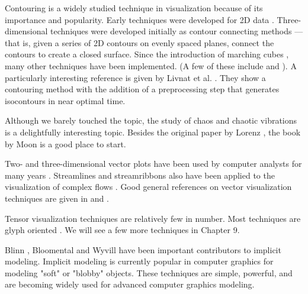 Contouring is a widely studied technique in visualization because of its importance and popularity. Early techniques were developed for 2D data \cite{Watson92}. Three-dimensional techniques were developed initially as contour connecting methods \cite{Fuchs77} --- that is, given a series of 2D contours on evenly spaced planes, connect the contours to create a closed surface. Since the introduction of marching cubes \cite{Lorensen87}, many other techniques have been implemented. (A few of these include \cite{Nielson91} \cite{Montani94} and \cite{Durst88} ). A particularly interesting reference is given by Livnat et al. \cite{Livnat96}. They show a contouring method with the addition of a preprocessing step that generates isocontours in near optimal time.

Although we barely touched the topic, the study of chaos and chaotic vibrations is a delightfully interesting topic. Besides the original paper by Lorenz \cite{Lorenz63}, the book by Moon \cite{Moon87} is a good place to start.

Two- and three-dimensional vector plots have been used by computer analysts for many years \cite{Fuller80}. Streamlines and streamribbons also have been applied to the visualization of complex flows \cite{Volpe89}. Good general references on vector visualization techniques are given in \cite{Helman90} and \cite{Richter90}.

Tensor visualization techniques are relatively few in number. Most techniques are glyph oriented \cite{Haber90} \cite{deLeeuw93}. We will see a few more techniques in Chapter 9.

Blinn \cite{Blinn82}, Bloomental \cite{Bloomenthal88} \cite{Bloomenthal97} and Wyvill \cite{Wyvill86} have been important contributors to implicit modeling. Implicit modeling is currently popular in computer graphics for modeling "soft" or "blobby" objects. These techniques are simple, powerful, and are becoming widely used for advanced computer graphics modeling.


\printbibliography


